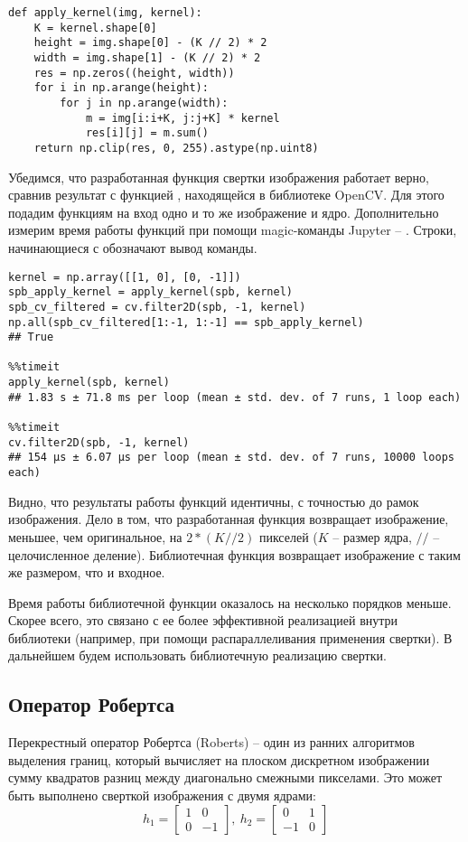 \begin{lstlisting}
def apply_kernel(img, kernel):
    K = kernel.shape[0]
    height = img.shape[0] - (K // 2) * 2
    width = img.shape[1] - (K // 2) * 2
    res = np.zeros((height, width))
    for i in np.arange(height):
        for j in np.arange(width):
            m = img[i:i+K, j:j+K] * kernel
            res[i][j] = m.sum()
    return np.clip(res, 0, 255).astype(np.uint8)
\end{lstlisting}

Убедимся, что разработанная функция свертки изображения работает верно, сравнив результат с функцией , находящейся в библиотеке OpenCV. Для этого подадим функциям на вход одно и то же изображение и ядро. Дополнительно измерим время работы функций при помощи magic-команды Jupyter -- . Строки, начинающиеся с \code{##} обозначают вывод команды.

\begin{lstlisting}
kernel = np.array([[1, 0], [0, -1]])
spb_apply_kernel = apply_kernel(spb, kernel)
spb_cv_filtered = cv.filter2D(spb, -1, kernel)
np.all(spb_cv_filtered[1:-1, 1:-1] == spb_apply_kernel)
## True

%%timeit
apply_kernel(spb, kernel)
## 1.83 s ± 71.8 ms per loop (mean ± std. dev. of 7 runs, 1 loop each)

%%timeit
cv.filter2D(spb, -1, kernel)
## 154 µs ± 6.07 µs per loop (mean ± std. dev. of 7 runs, 10000 loops each)
\end{lstlisting}

Видно, что результаты работы функций идентичны, с точностью до рамок изображения. Дело в том, что разработанная функция возвращает изображение, меньшее, чем оригинальное, на $2 * (K // 2)$ пикселей ($K$ -- размер ядра, $//$ -- целочисленное деление). Библиотечная функция  возвращает изображение с таким же размером, что и входное.

Время работы библиотечной функции оказалось на несколько порядков меньше. Скорее всего, это связано с ее более эффективной реализацией внутри библиотеки (например, при помощи распараллеливания применения свертки). В дальнейшем будем использовать библиотечную реализацию свертки.

\newpage

\subsection{Оператор Робертса}

Перекрестный оператор Робертса (Roberts) -- один из ранних алгоритмов выделения границ, который вычисляет на плоском дискретном изображении сумму квадратов разниц между диагонально смежными пикселами. Это может быть выполнено сверткой изображения с двумя ядрами:
$$
h_1 = \begin{bmatrix} 1 & 0 \\ 0 & -1 \end{bmatrix},\ 
h_2 = \begin{bmatrix} 0 & 1 \\ -1 & 0 \end{bmatrix}
$$

